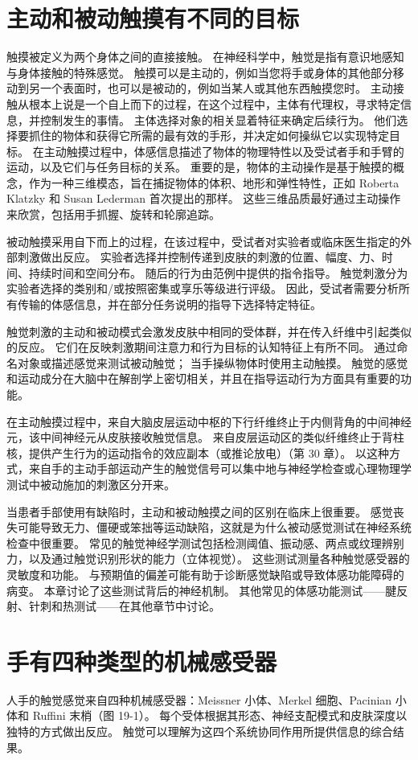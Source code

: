 \section{主动和被动触摸有不同的目标}
触摸被定义为两个身体之间的直接接触。 在神经科学中，触觉是指有意识地感知与身体接触的特殊感觉。 触摸可以是主动的，例如当您将手或身体的其他部分移动到另一个表面时，也可以是被动的，例如当某人或其他东西触摸您时。 主动接触从根本上说是一个自上而下的过程，在这个过程中，主体有代理权，寻求特定信息，并控制发生的事情。 主体选择对象的相关显着特征来确定后续行为。 他们选择要抓住的物体和获得它所需的最有效的手形，并决定如何操纵它以实现特定目标。 在主动触摸过程中，体感信息描述了物体的物理特性以及受试者手和手臂的运动，以及它们与任务目标的关系。 重要的是，物体的主动操作是基于触摸的概念，作为一种三维模态，旨在捕捉物体的体积、地形和弹性特性，正如 Roberta Klatzky 和 Susan Lederman 首次提出的那样。 这些三维品质最好通过主动操作来欣赏，包括用手抓握、旋转和轮廓追踪。

被动触摸采用自下而上的过程，在该过程中，受试者对实验者或临床医生指定的外部刺激做出反应。 实验者选择并控制传递到皮肤的刺激的位置、幅度、力、时间、持续时间和空间分布。 随后的行为由范例中提供的指令指导。 触觉刺激分为实验者选择的类别和/或按照密集或享乐等级进行评级。 因此，受试者需要分析所有传输的体感信息，并在部分任务说明的指导下选择特定特征。

触觉刺激的主动和被动模式会激发皮肤中相同的受体群，并在传入纤维中引起类似的反应。 它们在反映刺激期间注意力和行为目标的认知特征上有所不同。 通过命名对象或描述感觉来测试被动触觉； 当手操纵物体时使用主动触摸。 触觉的感觉和运动成分在大脑中在解剖学上密切相关，并且在指导运动行为方面具有重要的功能。

在主动触摸过程中，来自大脑皮层运动中枢的下行纤维终止于内侧背角的中间神经元，该中间神经元从皮肤接收触觉信息。 来自皮层运动区的类似纤维终止于背柱核，提供产生行为的运动指令的效应副本（或推论放电）（第 30 章）。 以这种方式，来自手的主动手部运动产生的触觉信号可以集中地与神经学检查或心理物理学测试中被动施加的刺激区分开来。

当患者手部使用有缺陷时，主动和被动触摸之间的区别在临床上很重要。 感觉丧失可能导致无力、僵硬或笨拙等运动缺陷，这就是为什么被动感觉测试在神经系统检查中很重要。 常见的触觉神经学测试包括检测阈值、振动感、两点或纹理辨别力，以及通过触觉识别形状的能力（立体视觉）。 这些测试测量各种触觉感受器的灵敏度和功能。 与预期值的偏差可能有助于诊断感觉缺陷或导致体感功能障碍的病变。 本章讨论了这些测试背后的神经机制。 其他常见的体感功能测试——腱反射、针刺和热测试——在其他章节中讨论。


\section{手有四种类型的机械感受器}
人手的触觉感觉来自四种机械感受器：Meissner 小体、Merkel 细胞、Pacinian 小体和 Ruffini 末梢（图 19-1）。 每个受体根据其形态、神经支配模式和皮肤深度以独特的方式做出反应。 触觉可以理解为这四个系统协同作用所提供信息的综合结果。

